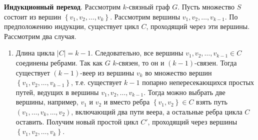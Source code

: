 \documentclass[russian]{article}
\begin{document}
\textbf{Индукционный переход}.  Рассмотрим
$k$-связный граф $G$. Пусть множество $S$ состоит из вершин $\left\{ v_{1},v_{2},\dots,v_{k}\right\} $.
Рассмотрим вершины $v_{1},v_{2},\dots,v_{k-1}$. По предположению
индукции, существует цикл $C$, проходящий через эти вершины. Рассмотрим два случая.
\begin{enumerate}
\item Длина цикла $|C| = k-1$. Следовательно, все вершины $v_{1},v_{2},\dots,v_{k-1}\in C$
соединены ребрами. Так как $G$ $k$-связен, то он и $(k-1)$-связен.
Тогда существует $(k-1)$-веер из вершины $v_{k}$ во множество вершин
$\left\{ v_{1},v_{2},\dots,v_{k-1}\right\} $, т.е. существует $k-1$
попарно непересекающихся простых путей, ведущих в вершины $v_{1},v_{2},\dots,v_{k-1}$. Тогда можно
выбрать две вершины, например, $v_{1}$ и $v_{2}$
и вместо ребра $\left\{ v_{1},v_{2}\right\} \in C$ взять путь $\left(v_{1},\dots,v_{k},\dots,v_{2}\right)$,
включающий два пути веера, а остальные ребра цикла $C$ оставить.
Получим новый простой цикл $C'$, проходящий через вершины $\left\{ v_{1},v_{2},\dots,v_{k}\right\} $.
\end{enumerate}
\end{document}
